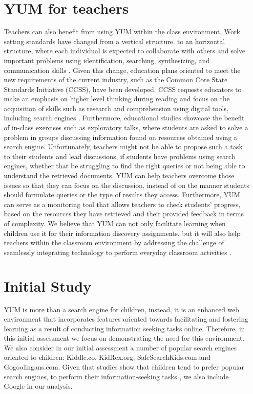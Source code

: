 \documentclass{sig-alternate-05-2015}
\begin{document}
\section{YUM for teachers}
\label{sec:teachers}
Teachers can also benefit from using YUM within the class environment. Work setting standards have changed from a vertical structure,
to an horizontal structure, where each individual is expected to collaborate with others and solve important problems using identification, searching, synthesizing, and communication skills \cite{leu13}. Given this change, education plans oriented to meet the new requirements of the current industry, such as the Common Core State Standards Initiative (CCSS), have been developed. CCSS requests educators to make an emphasis on higher level thinking during reading and focus on the acquisition of skills such as research and comprehension using digital tools, including search engines \cite{leu13}. Furthermore, educational studies \cite{kni15} showcase the benefit of in-class exercises such as  exploratory talks, where students are asked to solve a problem in groups discussing information found on resources obtained using a search engine. Unfortunately, teachers might not be able to propose such a task to their students and lead discussions, if students have problems using search engines, whether that be struggling to  find the right queries or not being able to  understand the retrieved documents. YUM can help teachers overcome those issues so that they can focus on the discussion, instead of on the manner students should formulate queries or the type of results they access. Furthermore, YUM can serve as a monitoring tool that allows teachers to check students' progress, based on the resources they have retrieved and their provided feedback in terms of complexity. We believe that  YUM can  not only facilitate learning when children use it for their information discovery assignments, but it will also help teachers within the classroom environment by  addressing the challenge of seamlessly integrating technology to perform everyday classroom activities \cite{Dan13,kni15}.

\section{Initial Study}
\label{sec:experiements}
YUM is more than a search engine for children, instead, it is an enhanced web environment that incorporates features oriented towards facilitating and fostering learning as a result of conducting information seeking tasks online. Therefore, in this initial assessment we focus on demonstrating the need for this environment. We also consider in our initial assessment a number of popular search engines oriented to children:  Kiddle.co, KidRex.org, SafeSearchKids.com and Gogoolingans.com. Given that studies show that children tend to prefer popular search engines, to perform their information-seeking tasks \cite{Bil13}, we also include Google in our analysis. 
\end{document}
